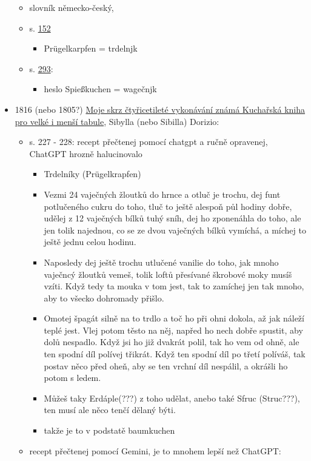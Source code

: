 \begin{itemize}
  \begin{itemize}
  \tightlist
  \item
    slovník německo-český,
  \item
    s.
    \href{https://ndk.cz/uuid/uuid:4672a240-c28c-11dc-9931-000d606f5dc6}{152}

    \begin{itemize}
    \tightlist
    \item
      Prügelkarpfen = trdelnjk
    \end{itemize}
  \item
    s.
    \href{https://ceskadigitalniknihovna.cz/uuid/uuid:9b4f95a7-eb8b-4008-8023-15cc5563f0ed}{293}:

    \begin{itemize}
    \tightlist
    \item
      heslo Spießkuchen = wagečnjk
    \end{itemize}
  \end{itemize}
\item
  1816 (nebo 1805?)
  \href{https://books.google.cz/books?id=7SZjAAAAcAAJ&hl=cs&pg=PA227\#v=onepage&q&f=false}{Moje
  skrz čtyřicetileté vykonávání známá Kuchařská kniha pro velké i menší
  tabule}, Sibylla (nebo Sibilla) Dorizio:

  \begin{itemize}
  \tightlist
  \item
    s. 227 - 228: recept přečtenej pomocí chatgpt a ručně opravenej,
    ChatGPT hrozně halucinovalo

    \begin{itemize}
    \tightlist
    \item
      Trdelníky (Prügelkrapfen)
    \item
      Vezmi 24 vaječných žloutků do hrnce a otluč je trochu, dej funt
      potlučeného cukru do toho, tluč to ještě alespoň půl hodiny dobře,
      udělej z 12 vaječných bílků tuhý sníh, dej ho zponenáhla do toho,
      ale jen tolik najednou, co se ze dvou vaječných bílků vymíchá, a
      míchej to ještě jednu celou hodinu.
    \item
      Naposledy dej ještě trochu utlučené vanilie do toho, jak mnoho
      vaječncý žloutků vemeš, tolik loftů přesívané škrobové moky musíš
      vzíti. Když tedy ta mouka v tom jest, tak to zamíchej jen tak
      mnoho, aby to všecko dohromady přišlo.
    \item
      Omotej špagát silně na to trdlo a toč ho při ohni dokola, až jak
      náleží teplé jest. Vlej potom těsto na něj, napřed ho nech dobře
      spustit, aby dolů nespadlo. Když jsi ho již dvakrát polil, tak ho
      vem od ohně, ale ten spodní díl polívej třikrát. Když ten spodní
      díl po třetí políváš, tak postav něco před oheň, aby se ten vrchní
      díl nespálil, a okrášli ho potom s ledem.
    \item
      Můžeš taky Erdáple(???) z toho udělat, anebo také Sfruc
      (Struc???), ten musí ale něco tenčí dělaný býti.
    \item
      takže je to v podstatě baumkuchen
    \end{itemize}
  \item
    recept přečtenej pomocí Gemini, je to mnohem lepší než ChatGPT:


\end{itemize}
\end{itemize}
